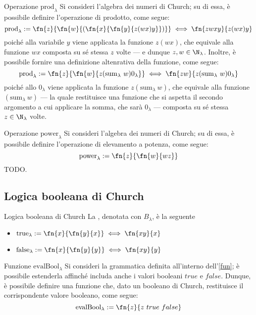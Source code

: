 \documentclass[a4paper, 12pt]{report}
\begin{document}
    \begin{framedprop}{Operazione $\mathrm{prod}_\lambda$}
        Si consideri l'algebra dei numeri di Church; su di essa, è possibile definire l'operazione di prodotto, come segue: $$\mathrm{prod}_\lambda := \fn{z}{\fn{w}{(\fn{x}{\fn{y}{z(wx)y}})}} \iff \fn{zwxy}{z(wx)y}$$ poiché alla variabile $y$ viene applicata la funzione $z(wx)$, che equivale alla funzione $wx$ composta su sé stessa $z$ volte --- e dunque $z, w \in \N_\lambda$. Inoltre, è possibile fornire una definizione altenrativa della funzione, come segue: $$\mathrm{prod}_\lambda := \fn{z}{\fn{w}{z (\mathrm{sum}_\lambda \ w)0_\lambda}} \iff \fn{zw}{z(\mathrm{sum}_\lambda \ w)0_\lambda}$$ poiché allo $0_\lambda$ viene applicata la funzione $z(\mathrm{sum}_\lambda \ w)$, che equivale alla funzione $(\mathrm{sum}_\lambda \ w)$ --- la quale restituisce una funzione che si aspetta il secondo argomento a cui applicare la somma, che sarà $0_\lambda$ --- composta su sé stessa $z \in \N_\lambda$ volte.
    \end{framedprop}

    \begin{framedprop}{Operazione $\mathrm{power}_\lambda$}
        Si consideri l'algebra dei numeri di Church; su di essa, è possibile definire l'operazione di elevamento a potenza, come segue: $$\mathrm{power}_\lambda := \fn{z}{\fn{w}{wz}}$$ TODO.
    \end{framedprop}

    \subsection{Logica booleana di Church}

    \begin{frameddefn}{Logica booleana di Church}
        La , denotata con $B_\lambda$, è la seguente

        \begin{itemize}
            \item $\mathrm{true}_\lambda := \fn{x}{\fn{y}{x}} \iff \fn{xy}{x}$
            \item $\mathrm{false}_\lambda := \fn{x}{\fn{y}{y}} \iff \fn{xy}{y}$
        \end{itemize}
    \end{frameddefn}

    \begin{framedprop}{Funzione $\mathrm{evalBool}_\lambda$}
        Si consideri la grammatica definita all'interno dell'\cref{fun}; è possibile estenderla affinché includa anche i valori booleani $true$ e $false$. Dunque, è possibile definire una funzione che, dato un booleano di Church, restituisce il corrispondente valore booleano, come segue: $$\mathrm{evalBool}_\lambda := \fn{z}{z \ true \ false}$$
    \end{framedprop}
\end{document}
